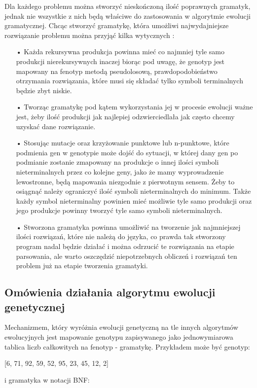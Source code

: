 Dla każdego problemu można stworzyć nieskończoną ilość poprawnych gramatyk, jednak nie wszystkie z nich będą właściwe do zastosowania w algorytmie ewolucji gramatycznej. Chcąc stworzyć gramatykę, która umożliwi najwydajniejsze rozwiązanie problemu można przyjąć kilka wytycznych \cite{grammarDesign}: 
\begin{itemize}
  \item[•] Każda rekursywna produkcja powinna mieć co najmniej tyle samo produkcji nierekursywnych inaczej biorąc pod uwagę, że genotyp jest mapowany na fenotyp metodą pseudolosową, prawdopodobieństwo otrzymania rozwiązania, które musi się składać tylko symboli terminalnych będzie zbyt niskie.
  \item[•] Tworząc gramatykę pod kątem wykorzystania jej w procesie ewolucji ważne jest, żeby ilość produkcji jak najlepiej odzwierciedlała jak często chcemy uzyskać dane rozwiązanie.
  \item[•] Stosując mutacje oraz krzyżowanie punktowe lub n-punktowe, które podmienia gen w genotypie może dojść do sytuacji, w której dany gen po podmianie zostanie zmapowany na produkcje o innej ilości symboli nieterminalnych przez co kolejne geny, jako że mamy wyprowadzenie lewostronne, będą mapowania niezgodnie z pierwotnym sensem. Żeby to osiągnąć należy ograniczyć ilość symboli nieterminalnych do minimum. Także każdy symbol nieterminalny powinien mieć możliwie tyle samo produkcji oraz jego produkcje powinny tworzyć tyle samo symboli nieterminalnych.
  \item[•] Stworzona gramatyka powinna umożliwić na tworzenie jak najmniejszej ilości rozwiązań, które nie należą do języka, co prawda tak stworzony program nadal będzie działać i można odrzucić te rozwiązania na etapie parsowania, ale warto oszczędzić niepotrzebnych obliczeń i rozwiązań ten problem już na etapie tworzenia gramatyki. 
\end{itemize}

\subsection{Omówienia działania algorytmu ewolucji genetycznej}
Mechanizmem, który wyróżnia ewolucji genetyczną na tle innych algorytmów ewolucyjnych jest mapowanie genotypu zapisywanego jako jednowymiarowa tablica liczb całkowitych na fenotyp - gramatykę. Przykładem może być genotyp: 
\begin{center} [6, 71, 92, 59, 52, 95, 23, 45, 12, 2] \end{center}
i gramatyka w notacji BNF:

